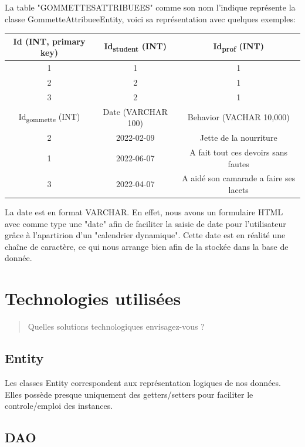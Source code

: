 \documentclass[11pt]{article}
\begin{document}
La table "GOMMETTESATTRIBUEES" comme son nom l'indique représente la classe
GommetteAttribueeEntity, voici sa représentation avec quelques exemples:

\begin{center}
\begin{tabular}{|c|c|c|}
\hline
Id (INT, primary key) & Id\textsubscript{student} (INT) & Id\textsubscript{prof} (INT)\\
\hline
1 & 1 & 1\\
2 & 2 & 1\\
3 & 2 & 1\\
\hline
Id\textsubscript{gommette} (INT) & Date (VARCHAR 100) & Behavior (VACHAR 10,000)\\
\hline
2 & 2022-02-09 & Jette de la nourriture\\
1 & 2022-06-07 & A fait tout ces devoirs sans fautes\\
3 & 2022-04-07 & A aidé son camarade a faire ses lacets\\
\hline
\end{tabular}
\end{center}

La date est en format VARCHAR. En effet, nous avons un formulaire HTML
avec comme type une "date" afin de faciliter la saisie de date pour l'utilisateur
grâce à l'apartirion d'un "calendrier dynamique". Cette date est en réalité
une chaîne de caractère, ce qui nous arrange bien afin de la stockée dans
la base de donnée.

\section{Technologies utilisées}
\label{sec:org78f5883}

\begin{quote}
Quelles solutions technologiques envisagez-vous ?
\end{quote}

\subsection{Entity}
\label{sec:orgcc46738}

Les classes Entity correspondent aux représentation logiques de nos données.
Elles possède presque uniquement des getters/setters pour faciliter le
controle/emploi des instances.

\subsection{DAO}
\label{sec:org239c0a1}
\end{document}

